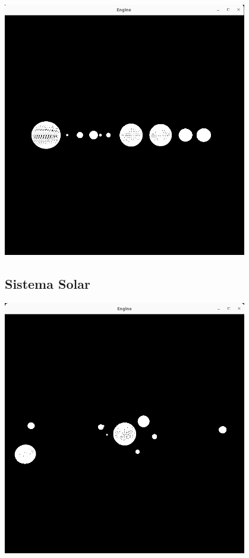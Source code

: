 \begin{center}
    \includegraphics[width=0.8\textwidth]{imgs/sissolarhor.png}
    \label{fig:solarlign}
\end{center}

\subsection{Sistema Solar}

\begin{center}
    \includegraphics[width=0.8\textwidth]{imgs/sissolar.png}
    \label{fig:solar}
\end{center}

